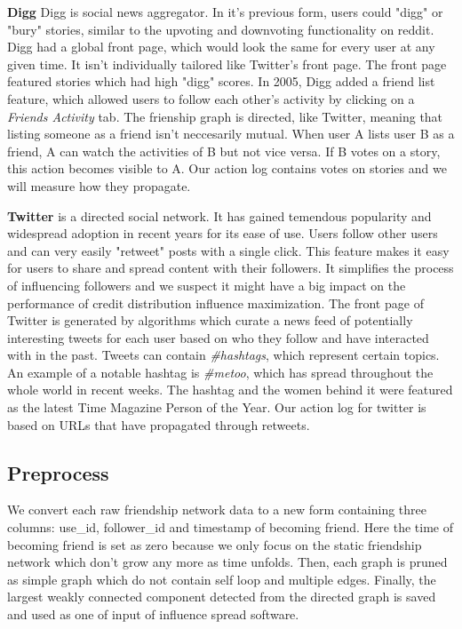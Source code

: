 \documentclass{acm_proc_article-sp}
\begin{document}
\textbf{Digg} \cite{data:digg-friends,data:digg-votes,data:digg} Digg is social news aggregator. In it's previous form, users could "digg" or "bury" stories, similar to the upvoting and downvoting functionality on reddit. Digg had a global front page, which would look the same for every user at any given time. It isn't individually tailored like Twitter's front page. The front page featured stories which had high "digg" scores. In 2005, Digg added a friend list feature, which allowed users to follow each other's activity by clicking on a \textit{Friends Activity} tab. The frienship graph is directed, like Twitter, meaning that listing someone as a friend isn't neccesarily mutual. When user A lists user B as a friend, A can watch the activities of B but not vice versa. If B votes on a story, this action becomes visible to A. Our action log contains votes on stories and we will measure how they propagate. \cite{DBLP:journals/corr/abs-1202-3162}

\textbf{Twitter} \cite{data:twitter} is a directed social network. It has gained temendous popularity and widespread adoption in recent years for its ease of use. Users follow other users and can very easily "retweet" posts with a single click. This feature makes it easy for users to share and spread content with their followers. It simplifies the process of influencing followers and we suspect it might have a big impact on the performance of credit distribution influence maximization. The front page of Twitter is generated by algorithms which curate a news feed of potentially interesting tweets for each user based on who they follow and have interacted with in the past. Tweets can contain \textit{\#hashtags}, which represent certain topics. An example of a notable hashtag is \textit{\#metoo}, which has spread throughout the whole world in recent weeks. The hashtag and the women behind it were featured as the latest Time Magazine Person of the Year. Our action log for twitter is based on URLs that have propagated through retweets.

\subsection*{Preprocess}
We convert each raw friendship network data to a new form containing three columns: use\_id, follower\_id and timestamp of becoming friend. Here the time of becoming friend is set as zero because we only focus on the static friendship network which don't grow any more as time unfolds. Then, each graph is pruned as simple graph which do not contain self loop and multiple edges. Finally, the largest weakly connected component detected from the directed graph is saved and used as one of input of influence spread software.
\end{document}
